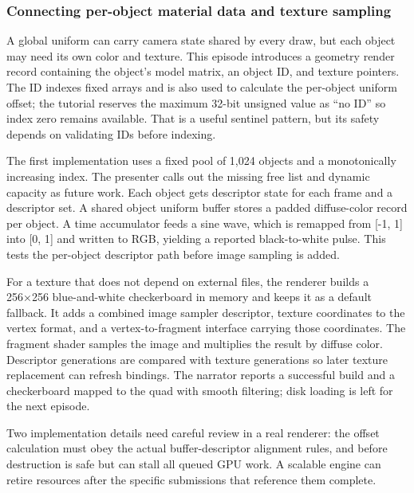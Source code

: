 \subsubsection{Connecting per-object material data and texture sampling}\label{06-engine-ii-ch025-connecting-per-object-material-data-and-texture-sampling}

\hypertarget{06-engine-ii-ch025-connecting-per-object-material-data-and-texture-sampling}{}

A global uniform can carry camera state shared by every draw, but each object may need its own color and texture. This episode introduces a geometry render record containing the object's model matrix, an object ID, and texture pointers. The ID indexes fixed arrays and is also used to calculate the per-object uniform offset; the tutorial reserves the maximum 32-bit unsigned value as ``no ID'' so index zero remains available. That is a useful sentinel pattern, but its safety depends on validating IDs before indexing.

The first implementation uses a fixed pool of 1,024 objects and a monotonically increasing index. The presenter calls out the missing free list and dynamic capacity as future work. Each object gets descriptor state for each frame and a descriptor set. A shared object uniform buffer stores a padded diffuse-color record per object. A time accumulator feeds a sine wave, which is remapped from {[}-1, 1{]} into {[}0, 1{]} and written to RGB, yielding a reported black-to-white pulse. This tests the per-object descriptor path before image sampling is added.

For a texture that does not depend on external files, the renderer builds a 256×256 blue-and-white checkerboard in memory and keeps it as a default fallback. It adds a combined image sampler descriptor, texture coordinates to the vertex format, and a vertex-to-fragment interface carrying those coordinates. The fragment shader samples the image and multiplies the result by diffuse color. Descriptor generations are compared with texture generations so later texture replacement can refresh bindings. The narrator reports a successful build and a checkerboard mapped to the quad with smooth filtering; disk loading is left for the next episode.

Two implementation details need careful review in a real renderer: the offset calculation must obey the actual buffer-descriptor alignment rules, and  before destruction is safe but can stall all queued GPU work. A scalable engine can retire resources after the specific submissions that reference them complete.

